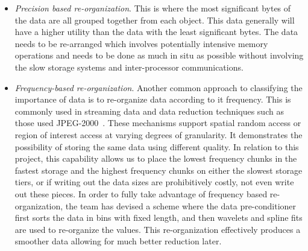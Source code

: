 \begin{itemize} 
	
\item {\em Precision based re-organization}. This is where the most significant bytes
	of the data are all grouped together from each object. This data
	generally will have a higher utility than the data with the least
	significant bytes. 
	The data needs to be re-arranged which involves potentially intensive 
        memory operations and needs to be done as much in situ as possible without
        involving the slow storage systems and inter-processor communications.
%
\item {\em Frequency-based re-organization}.  Another common approach to classifying
	the importance of data is to re-organize data according to it frequency.
	This is commonly used in streaming data and data reduction techniques
        such as those used JPEG-2000~\cite{jpeg2000}. These mechanisms
	support spatial random access or region of interest
	access at varying degrees of granularity. It demonstrates the possibility of storing
	the same data using different quality. In relation to this project, this
        capability allows us to place the lowest frequency chunks in the fastest storage and the
	highest frequency chunks on either the slowest storage tiers, or if writing out the data
	sizes are prohibitively costly, not even write out these pieces. 
	 In order to fully take advantage of frequency based
	re-organization, the team has devised a scheme where the data pre-conditioner
	first sorts the data in bins with fixed length, and then wavelets and spline fits are used to
	re-organize the values.  This re-organization effectively produces
	a smoother data allowing for much better reduction later.
\end{itemize}

